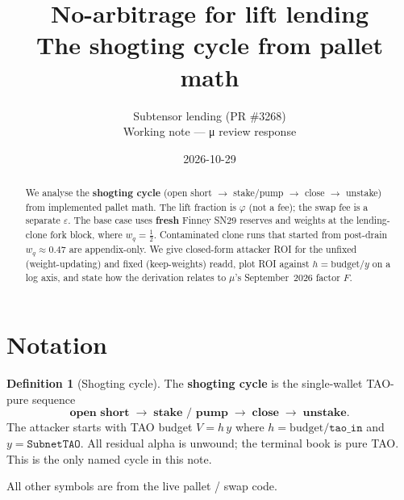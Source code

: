 \documentclass[11pt]{article}
\title{No-arbitrage for lift lending\\
\large The shogting cycle from pallet math}
\author{Subtensor lending (PR \#3268)\\
Working note --- μ review response}
\date{2026-10-29}
\theoremstyle{definition}
\newtheorem{definition}{Definition}
\theoremstyle{remark}
\begin{document}
\maketitle

\begin{abstract}
We analyse the \textbf{shogting cycle}
(open short $\to$ stake/pump $\to$ close $\to$ unstake)
from implemented pallet math. The lift fraction is $\varphi$ (not a
fee); the swap fee is a separate $\varepsilon$. The base case uses
\textbf{fresh} Finney SN29 reserves and weights at the lending-clone
fork block, where $w_q=\tfrac12$. Contaminated clone runs that started
from post-drain $w_q\approx 0.47$ are appendix-only. We give closed-form
attacker ROI for the unfixed (weight-updating) and fixed
(keep-weights) readd, plot ROI against
$h=\mathrm{budget}/y$ on a log axis, and state how the derivation
relates to $\mu$'s September~2026 factor $F$.
\end{abstract}

\tableofcontents

\section{Notation}
\label{sec:notation}

\begin{definition}[Shogting cycle]
\label{def:shogting}
The \textbf{shogting cycle} is the single-wallet TAO-pure sequence
\[
  \textbf{open short}
  \;\to\;
  \textbf{stake / pump}
  \;\to\;
  \textbf{close}
  \;\to\;
  \textbf{unstake}.
\]
The attacker starts with TAO budget $V=h\,y$ where
$h=\mathrm{budget}/\texttt{tao\_in}$ and $y=\texttt{SubnetTAO}$.
All residual alpha is unwound; the terminal book is pure TAO.
This is the only named cycle in this note.
\end{definition}

All other symbols are from the live pallet / swap code.
\end{document}
